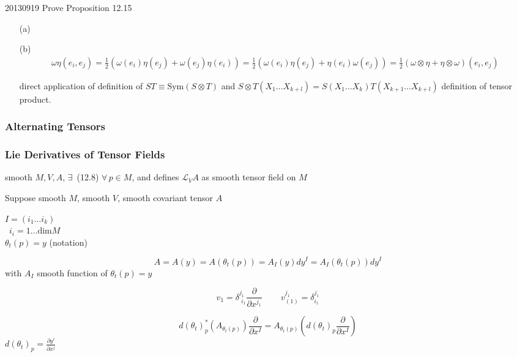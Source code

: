 20130919
 Prove Proposition 12.15

\begin{enumerate}
\item[(a)]
\item[(b)] \[
\begin{gathered}
  \omega \eta(e_i, e_j) = \frac{1}{2} ( \omega(e_i) \eta(e_j) + \omega(e_j) \eta(e_i)  ) = \frac{1}{2} ( \omega(e_i) \eta(e_j) + \eta(e_i) \omega(e_j)) = \frac{1}{2} ( \omega \otimes \eta + \eta \otimes \omega)(e_i ,e_j)
\end{gathered}
\]

direct application of definition of $ST \equiv \text{Sym}{(S\otimes T)}$ and $S\otimes T(X_1 \dots X_{k+l} ) = S(X_1 \dots X_k) T(X_{k+1} \dots X_{k+l})$ definition of tensor product.  

\end{enumerate}

\subsubsection*{Alternating Tensors}





\subsubsection*{Lie Derivatives of Tensor Fields}



\begin{lemma}[12.30] smooth $M,V,A$, $\exists \, $ (12.8) $\forall \, p \in M$, and defines $\mathcal{L}_VA$ as smooth tensor field on $M$
\end{lemma}


Suppose smooth $M$, smooth $V$, smooth covariant tensor $A$

$I = (i_1 \dots i_k)$ \\
\quad \, $i_i = 1 \dots \text{dim}{M}$ \\

$\theta_t(p) = y$ (notation) 

\[
A = A(y) = A(\theta_t(p)) = A_I(y) dy^I = A_I(\theta_t(p)) dy^I
\]
with $A_I$ smooth function of $\theta_t(p) = y$


\[
v_1 = \delta^{j_1}_{ \, \, i_1} \frac{ \partial }{ \partial x^{j_1}} \quad \quad \, v^{j_1}_{ (1)} = \delta^{j_1}_{ i_1}
\]


\[
d(\theta_t)^*_p(A_{\theta_t(p)}) \frac{ \partial }{ \partial x^I} = A_{\theta_t(p)}(d(\theta_t)_p \frac{ \partial }{ \partial x^I } )
\]
$d(\theta_t)_p = \frac{ \partial y^i}{ \partial x^j}$

